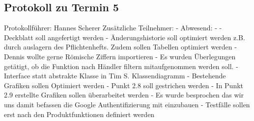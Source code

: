 \subsection{Protokoll zu Termin 5}
Protokollführer: Hannes Scherer \newline
Zusätzliche Teilnehmer: - \newline
Abwesend: - \newline \newline
  - Deckblatt soll angefertigt werden \newline
  - Änderungshistorie soll optimiert werden z.B. durch auslagern des Pflichtenhefts. Zudem sollen Tabellen optimiert werden \newline
  - Dennis wollte gerne Römische Ziffern importieren \newline
  - Es wurden Überlegungen getätigt, ob die Funktion nach Händler filtern mitaufgenommen werden soll. \newline
  - Interface statt abstrakte Klasse in Tim S. Klassendiagramm \newline
  - Bestehende Grafiken sollen Optimiert werden \newline
  - Punkt 2.8 soll gestrichen werden \newline
  - In Punkt 2.9 erstellte Grafiken sollen überarbeitet werden \newline
  - Es wurde besprochen das wir uns damit befassen die Google Authentifizierung mit einzubauen \newline
  - Testfälle sollen erst nach den Produktfunktionen definiert werden \newline

\newpage

